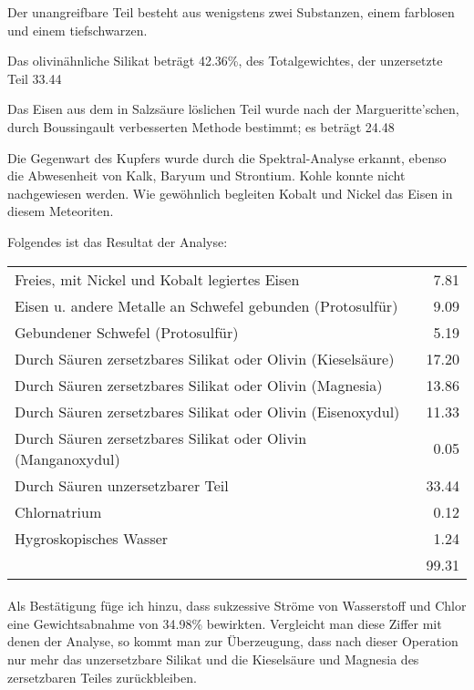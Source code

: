 \documentclass[a4paper, 11pt, oneside]{article}
\begin{document}
Der unangreifbare Teil besteht aus wenigstens zwei Substanzen, einem farblosen und einem tiefschwarzen.

Das olivinähnliche Silikat beträgt 42.36\%, des Totalgewichtes, der unzersetzte Teil 33.44%

Das Eisen aus dem in Salzsäure löslichen Teil wurde nach der Margueritte'schen, durch Boussingault verbesserten Methode bestimmt; es beträgt 24.48%

Die Gegenwart des Kupfers wurde durch die Spektral-Analyse erkannt, ebenso die Abwesenheit von Kalk, Baryum und Strontium. Kohle konnte nicht nachgewiesen werden. Wie gewöhnlich begleiten Kobalt und Nickel das Eisen in diesem Meteoriten.

Folgendes ist das Resultat der Analyse:
\begin{center}
\begin{tabular}{ l r }
    Freies, mit Nickel und Kobalt legiertes Eisen & 7.81\\
    Eisen u. andere Metalle an Schwefel gebunden (Protosulfür) & 9.09\\
    Gebundener Schwefel (Protosulfür) & 5.19\\
    Durch Säuren zersetzbares Silikat oder Olivin (Kieselsäure) & 17.20\\
    Durch Säuren zersetzbares Silikat oder Olivin (Magnesia) & 13.86\\
    Durch Säuren zersetzbares Silikat oder Olivin (Eisenoxydul) & 11.33\\
    Durch Säuren zersetzbares Silikat oder Olivin (Manganoxydul) & 0.05\\
    Durch Säuren unzersetzbarer Teil & 33.44\\
    Chlornatrium & 0.12\\
    Hygroskopisches Wasser & 1.24\\
     & 99.31\\
\end{tabular}
\end{center}
\paragraph{}
Als Bestätigung füge ich hinzu, dass sukzessive Ströme von Wasserstoff und Chlor eine Gewichtsabnahme von 34.98\% bewirkten. Vergleicht man diese Ziffer mit denen der Analyse, so kommt man zur Überzeugung, dass nach dieser Operation nur mehr das unzersetzbare Silikat und die Kieselsäure und Magnesia des zersetzbaren Teiles zurückbleiben.
\end{document}
